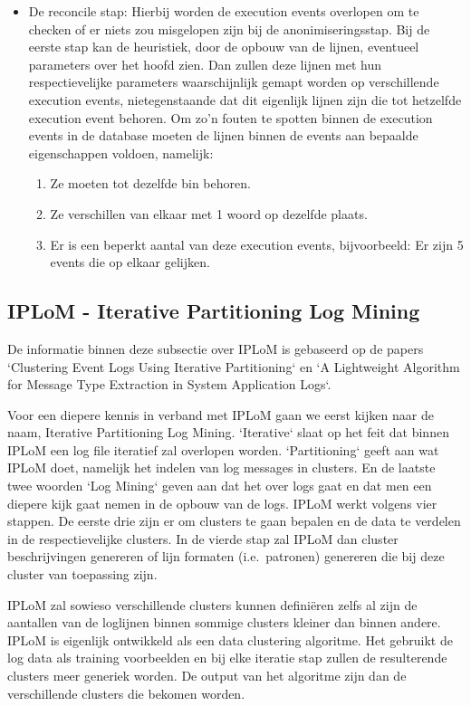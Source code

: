 \begin{itemize}
    \item De reconcile stap: Hierbij worden de execution events overlopen om te checken of er niets zou misgelopen zijn bij de anonimiseringsstap. Bij de eerste stap kan de heuristiek, door de opbouw van de lijnen, eventueel parameters over het hoofd zien. Dan zullen deze lijnen met hun respectievelijke parameters waarschijnlijk gemapt worden op verschillende execution events, nietegenstaande dat dit eigenlijk lijnen zijn die tot hetzelfde execution event behoren. Om zo'n fouten te spotten binnen de execution events in de database moeten de lijnen binnen de events aan bepaalde eigenschappen voldoen, namelijk:
    \begin{enumerate}
        \item Ze moeten tot dezelfde bin behoren.
        \item Ze verschillen van elkaar met 1 woord op dezelfde plaats.
        \item Er is een beperkt aantal van deze execution events, bijvoorbeeld: Er zijn 5 events die op elkaar gelijken.
    \end{enumerate}
\end{itemize}

\subsection{IPLoM - Iterative Partitioning Log Mining}
De informatie binnen deze subsectie over IPLoM is gebaseerd op de papers `Clustering Event Logs Using Iterative Partitioning` \autocite{makanju2009clustering} en `A Lightweight Algorithm for Message Type Extraction in System Application Logs`\autocite{5936060}.

Voor een diepere kennis in verband met IPLoM gaan we eerst kijken naar de naam, Iterative Partitioning Log Mining. `Iterative` slaat op het feit dat binnen IPLoM een log file iteratief zal overlopen worden. `Partitioning` geeft aan wat IPLoM doet, namelijk het indelen van log messages in clusters. En de laatste twee woorden `Log Mining` geven aan dat het over logs gaat en dat men een diepere kijk gaat nemen in de opbouw van de logs. IPLoM werkt volgens vier stappen. De eerste drie zijn er om clusters te gaan bepalen en de data te verdelen in de respectievelijke clusters. In de vierde stap zal IPLoM dan cluster beschrijvingen genereren of lijn formaten (i.e.\ patronen) genereren die bij deze cluster van toepassing zijn. 

IPLoM zal sowieso verschillende clusters kunnen definiëren zelfs al zijn de aantallen van de loglijnen binnen sommige clusters kleiner dan binnen andere. IPLoM is eigenlijk ontwikkeld als een data clustering algoritme. Het gebruikt de log data als training voorbeelden en bij elke iteratie stap zullen de resulterende clusters meer generiek worden. De output van het algoritme zijn dan de verschillende clusters die bekomen worden. 

